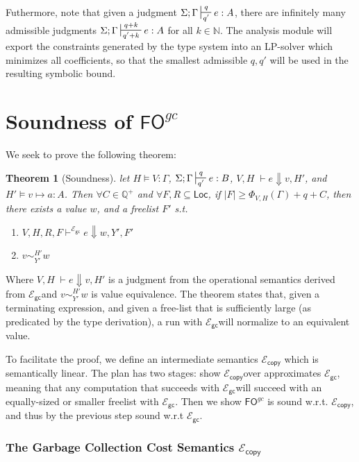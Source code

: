 \documentclass{easychair}
\newtheorem{theorem}{Theorem}
\newcommand{\ms}[1]{\ensuremath{\mathsf{#1}}}
\newcommand{\veq}[4]{#3 \sim^{#1}_{#2} #4}
\newcommand{\fogc}{\ms{FO}^{gc}}
\newcommand{\gcSem}{\ensuremath{\mathcal{E}_{\ms{gc}}}}
\newcommand{\copySem}{\ensuremath{\mathcal{E}_{\ms{copy}}}}
\theoremstyle{definition}
\begin{document}
Futhermore, note that given a judgment $\Sigma;\Gamma \sststile{q'}{q} e : A$, there are 
infinitely many admissible judgments $\Sigma;\Gamma \sststile{q' + k}{q + k} e : A$ 
for all $k \in \mathbb{N}$. The analysis module will export the constraints generated 
by the type system into an LP-solver which minimizes all coefficients, so that the 
smallest admissible $q,q'$ will be used in the resulting symbolic bound.

\section{Soundness of $\fogc$}

We seek to prove the following theorem: 

\begin{theorem}[Soundness]
\label{itm:soundness} let $H \vDash V : \Gamma$, $\Sigma; \Gamma \sststile{q'}{q} e : B$,
$V,H \; \vdash e \Downarrow v, H'$, and $H' \vDash v \mapsto a : A$.
Then $\forall C \in \mathbb{Q}^{+}$ and $\forall F,R \subseteq \ms{Loc}$,
if $|F| \ge \Phi_{V,H}(\Gamma) + q + C$,
then there exists a value $w$, and a freelist $F'$ s.t.
\begin{enumerate}
	\item $V,H,R,F \vdash^{\gcSem} e \Downarrow w, Y', F'$
	\item $\veq{H'}{Y'}{v}{w}$
\end{enumerate}
\end{theorem}

Where $V,H \; \vdash e \Downarrow v, H'$ is a judgment from the operational semantics
derived from \gcSem and $\veq{H'}{Y'}{v}{w}$ is value equivalence. The theorem states that,
given a terminating expression,
and given a free-list that is sufficiently large (as predicated by the type derivation), 
a run with \gcSem will normalize to an equivalent value.

To facilitate the proof, we define an intermediate semantics \copySem 
which is semantically linear. The plan has two stages: show \copySem over 
approximates \gcSem, meaning that any computation that succeeds with \gcSem will succeed with 
an equally-sized or smaller freelist with \gcSem. Then we 
show $\fogc$ is sound w.r.t. \copySem, and thus by the previous step sound w.r.t \gcSem.

\subsubsection{The Garbage Collection Cost Semantics \copySem}
\label{sect:copy}
\end{document}
